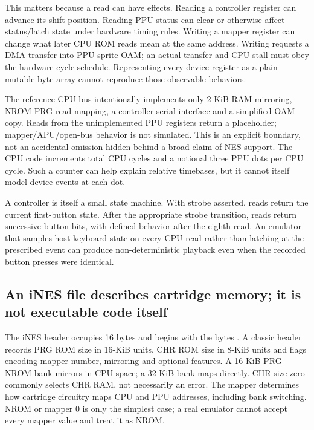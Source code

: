 This matters because a read can have effects. Reading a controller register can advance its shift position. Reading PPU status can clear or otherwise affect status/latch state under hardware timing rules. Writing a mapper register can change what later CPU ROM reads mean at the same address. Writing  requests a DMA transfer into PPU sprite OAM; an actual transfer and CPU stall must obey the hardware cycle schedule. Representing every device register as a plain mutable byte array cannot reproduce those observable behaviors.

The reference CPU bus intentionally implements only 2-KiB RAM mirroring, NROM PRG read mapping, a controller serial interface and a simplified OAM copy. Reads from the unimplemented PPU registers return a placeholder; mapper/APU/open-bus behavior is not simulated. This is an explicit boundary, not an accidental omission hidden behind a broad claim of NES support. The CPU code increments total CPU cycles and a notional three PPU dots per CPU cycle. Such a counter can help explain relative timebases, but it cannot itself model device events at each dot.

A controller is itself a small state machine. With strobe asserted, reads return the current first-button state. After the appropriate strobe transition, reads return successive button bits, with defined behavior after the eighth read. An emulator that samples host keyboard state on every CPU read rather than latching at the prescribed event can produce non-deterministic playback even when the recorded button presses were identical.

\subsection{An iNES file describes cartridge memory; it is not executable code itself}\label{01-foundations-i-ch016-an-ines-file-describes-cartridge-memory-it-is-not-executable-code-itself}

\hypertarget{01-foundations-i-ch016-an-ines-file-describes-cartridge-memory-it-is-not-executable-code-itself}{}

The iNES header occupies 16 bytes and begins with the bytes    . A classic header records PRG ROM size in 16-KiB units, CHR ROM size in 8-KiB units and flags encoding mapper number, mirroring and optional features. A 16-KiB PRG NROM bank mirrors in CPU space; a 32-KiB bank maps directly. CHR size zero commonly selects CHR RAM, not necessarily an error. The mapper determines how cartridge circuitry maps CPU and PPU addresses, including bank switching. NROM or mapper 0 is only the simplest case; a real emulator cannot accept every mapper value and treat it as NROM.

